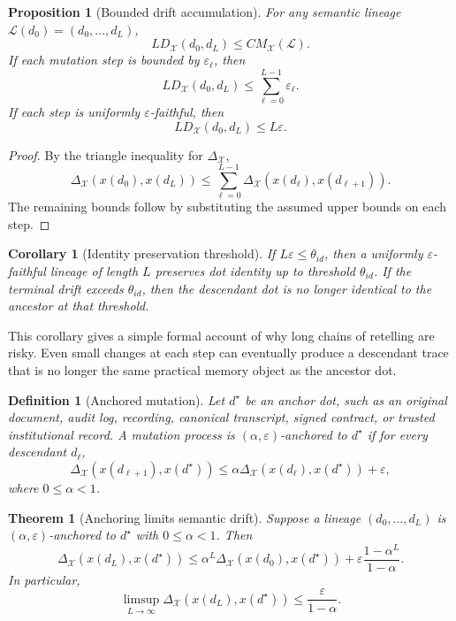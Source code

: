 \documentclass[11pt]{article}
\newtheorem{definition}{Definition}
\newtheorem{theorem}{Theorem}
\newtheorem{proposition}{Proposition}
\newtheorem{corollary}{Corollary}
\theoremstyle{remark}
\begin{document}
\begin{proposition}[Bounded drift accumulation]\label{prop:bounded-drift-accumulation}
For any semantic lineage $\mathcal L(d_0)=(d_0,\ldots,d_L)$,
$$
LD_{\mathcal X}(d_0,d_L)\leq CM_{\mathcal X}(\mathcal L).
$$
If each mutation step is bounded by $\varepsilon_{\ell}$, then
$$
LD_{\mathcal X}(d_0,d_L)\leq \sum_{\ell=0}^{L-1}\varepsilon_{\ell}.
$$
If each step is uniformly $\varepsilon$-faithful, then
$$
LD_{\mathcal X}(d_0,d_L)\leq L\varepsilon.
$$
\end{proposition}

\begin{proof}
By the triangle inequality for $\Delta_{\mathcal X}$,
$$
\Delta_{\mathcal X}(x(d_0),x(d_L))
\leq
\sum_{\ell=0}^{L-1}
\Delta_{\mathcal X}(x(d_{\ell}),x(d_{\ell+1})).
$$
The remaining bounds follow by substituting the assumed upper bounds on
each step.
\end{proof}

\begin{corollary}[Identity preservation threshold]\label{cor:identity-preservation-threshold}
If $L\varepsilon\leq \theta_{id}$, then a uniformly
$\varepsilon$-faithful lineage of length $L$ preserves dot identity up
to threshold $\theta_{id}$. If the terminal drift exceeds
$\theta_{id}$, then the descendant dot is no longer identical to the
ancestor at that threshold.
\end{corollary}

This corollary gives a simple formal account of why long chains of
retelling are risky. Even small changes at each step can eventually
produce a descendant trace that is no longer the same practical memory
object as the ancestor dot.

\begin{definition}[Anchored mutation]\label{def:anchored-mutation}
Let $d^\star$ be an anchor dot, such as an original document, audit log,
recording, canonical transcript, signed contract, or trusted
institutional record. A mutation process is $(\alpha,\varepsilon)$-anchored
to $d^\star$ if for every descendant $d_{\ell}$,
$$
\Delta_{\mathcal X}(x(d_{\ell+1}),x(d^\star))
\leq
\alpha \Delta_{\mathcal X}(x(d_{\ell}),x(d^\star))+\varepsilon,
$$
where $0\leq \alpha<1$.
\end{definition}

\begin{theorem}[Anchoring limits semantic drift]\label{thm:anchoring-limits-semantic-drift}
Suppose a lineage $(d_0,\ldots,d_L)$ is
$(\alpha,\varepsilon)$-anchored to $d^\star$ with $0\leq \alpha<1$.
Then
$$
\Delta_{\mathcal X}(x(d_L),x(d^\star))
\leq
\alpha^L\Delta_{\mathcal X}(x(d_0),x(d^\star))
+
\varepsilon\frac{1-\alpha^L}{1-\alpha}.
$$
In particular,
$$
\limsup_{L\to\infty}
\Delta_{\mathcal X}(x(d_L),x(d^\star))
\leq
\frac{\varepsilon}{1-\alpha}.
$$
\end{theorem}
\end{document}

